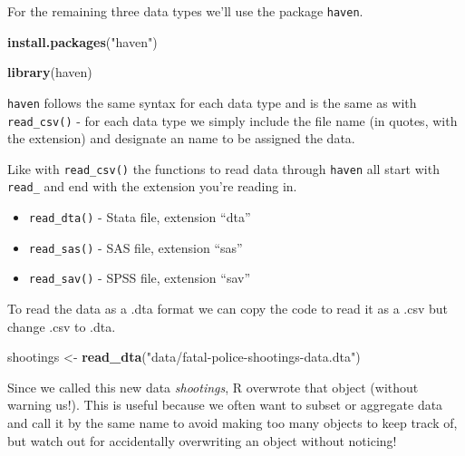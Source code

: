 \documentclass[
  12pt,
]{book}
\newenvironment{Shaded}{\begin{snugshade}}{\end{snugshade}}
\newcommand{\KeywordTok}[1]{\textcolor[rgb]{0.27,0.27,0.27}{\textbf{#1}}}
\newcommand{\NormalTok}[1]{#1}
\newcommand{\StringTok}[1]{\textcolor[rgb]{0.5,0.5,0.5}{#1}}
\providecommand{\tightlist}{%
  \setlength{\itemsep}{0pt}\setlength{\parskip}{0pt}}
\begin{document}
For the remaining three data types we'll use the package \texttt{haven}.

\begin{Shaded}
\begin{Highlighting}[]
\KeywordTok{install.packages}\NormalTok{(}\StringTok{"haven"}\NormalTok{)}
\end{Highlighting}
\end{Shaded}

\begin{Shaded}
\begin{Highlighting}[]
\KeywordTok{library}\NormalTok{(haven)}
\end{Highlighting}
\end{Shaded}

\texttt{haven} follows the same syntax for each data type and is the same as with \texttt{read\_csv()} - for each data type we simply include the file name (in quotes, with the extension) and designate an name to be assigned the data.

Like with \texttt{read\_csv()} the functions to read data through \texttt{haven} all start with \texttt{read\_} and end with the extension you're reading in.

\begin{itemize}
\tightlist
\item
  \texttt{read\_dta()} - Stata file, extension ``dta''
\item
  \texttt{read\_sas()} - SAS file, extension ``sas''
\item
  \texttt{read\_sav()} - SPSS file, extension ``sav''
\end{itemize}

To read the data as a .dta format we can copy the code to read it as a .csv but change .csv to .dta.

\begin{Shaded}
\begin{Highlighting}[]
\NormalTok{shootings \textless{}{-}}\StringTok{ }\KeywordTok{read\_dta}\NormalTok{(}\StringTok{"data/fatal{-}police{-}shootings{-}data.dta"}\NormalTok{)}
\end{Highlighting}
\end{Shaded}

Since we called this new data \emph{shootings}, R overwrote that object (without warning us!). This is useful because we often want to subset or aggregate data and call it by the same name to avoid making too many objects to keep track of, but watch out for accidentally overwriting an object without noticing!
\end{document}
